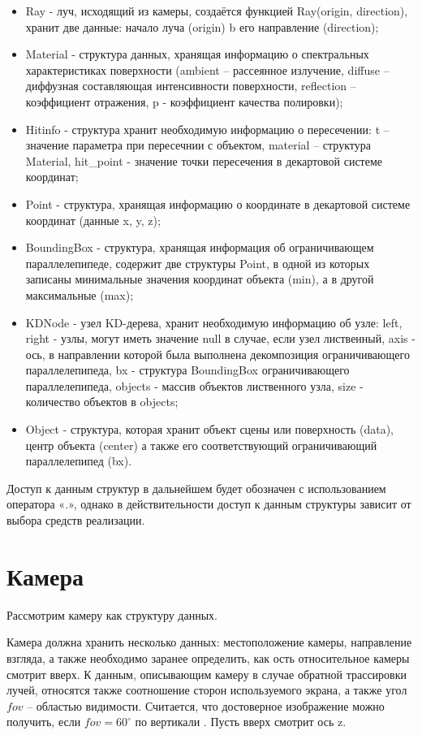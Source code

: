 \begin{itemize}
	\item Ray - луч, исходящий из камеры, создаётся функцией Ray(origin, direction), хранит две данные: начало луча (origin) b его направление (direction);
	\item Material - структура данных, хранящая информацию о спектральных характеристиках поверхности (ambient -- рассеянное излучение, diffuse -- диффузная составляющая интенсивности поверхности, reflection -- коэффициент отражения, p - коэффициент качества полировки);
	\item Hitinfo - структура хранит необходимую информацию о пересечении: t -- значение параметра при пересечнии с объектом, material -- структура Material, hit\_point - значение точки пересечения в декартовой системе координат;
	\item Point - структура, хранящая информацию о координате в декартовой системе координат (данные x, y, z);
	\item BoundingBox - структура, хранящая информация об ограничивающем параллелепипеде, содержит две структуры Point, в одной из которых записаны минимальные значения координат объекта (min), а в другой максимальные (max);
	\item KDNode - узел KD-дерева, хранит необходимую информацию об узле: left, right - узлы, могут иметь значение null в случае, если узел лиственный, axis - ось, в направлении которой была выполнена декомпозиция ограничивающего параллелепипеда, bx - структура BoundingBox ограничивающего параллелепипеда, objects - массив объектов лиственного узла, size - количество объектов в objects;
	\item Object - структура, которая хранит объект сцены или поверхность (data), центр объекта (center) а также его соответствующий ограничивающий параллелепипед (bx).
\end{itemize}

Доступ к данным структур в дальнейшем будет обозначен с использованием оператора «.», однако в действительности доступ к данным структуры зависит от выбора средств реализации.

\section{Камера}

Рассмотрим камеру как структуру данных.

Камера должна хранить несколько данных: местоположение камеры, направление взгляда, а также необходимо заранее определить, как ость относительное камеры смотрит вверх. 
К данным, описывающим камеру в случае обратной трассировки лучей, относятся также соотношение сторон используемого экрана, а также угол $fov$ -- областью видимости. 
Считается, что достоверное изображение можно получить, если $fov = 60^\circ$ по вертикали \cite{kgmmgtu}.
Пусть вверх смотрит ось z.


